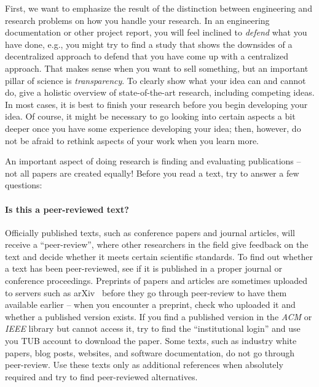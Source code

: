 \documentclass[a4paper]{article}
\begin{document}
First, we want to emphasize the result of the distinction between engineering and research problems on how you handle your research.
In an engineering documentation or other project report, you will feel inclined to \emph{defend} what you have done, e.g., you might try to find a study that shows the downsides of a decentralized approach to defend that you have come up with a centralized approach.
That makes sense when you want to sell something, but an important pillar of science is \emph{transparency}.
To clearly show what your idea can and cannot do, give a holistic overview of state-of-the-art research, including competing ideas.
In most cases, it is best to finish your research before you begin developing your idea.
Of course, it might be necessary to go looking into certain aspects a bit deeper once you have some experience developing your idea; then, however, do not be afraid to rethink aspects of your work when you learn more.

An important aspect of doing research is finding and evaluating publications -- not all papers are created equally!
Before you read a text, try to answer a few questions:

\paragraph{Is this a peer-reviewed text?}
Officially published texts, such as conference papers and journal articles, will receive a ``peer-review'', where other researchers in the field give feedback on the text and decide whether it meets certain scientific standards.
To find out whether a text has been peer-reviewed, see if it is published in a proper journal or conference proceedings.
Preprints of papers and articles are sometimes uploaded to servers such as arXiv~\cite{arxiv} before they go through peer-review to have them available earlier -- when you encounter a preprint, check who uploaded it and whether a published version exists.
If you find a published version in the \emph{ACM} or \emph{IEEE} library but cannot access it, try to find the ``institutional login'' and use you TUB account to download the paper.
Some texts, such as industry white papers, blog posts, websites, and software documentation, do not go through peer-review.
Use these texts only as additional references when absolutely required and try to find peer-reviewed alternatives.
\end{document}
